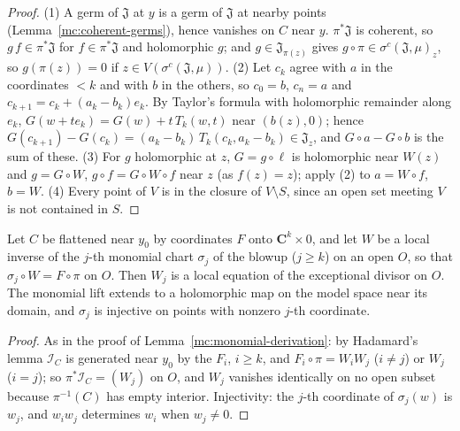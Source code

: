 \begin{proof}
\leanok
(1) A germ of \(\mathfrak J\) at \(y\) is a germ of \(\mathfrak J\) at nearby points (Lemma~\ref{mc:coherent-germs}), hence vanishes on \(C\) near \(y\).
\(\pi^*\mathfrak J\) is coherent, so \(g\,f\in\pi^*\mathfrak J\) for \(f\in\pi^*\mathfrak J\) and holomorphic \(g\); and \(g\in\mathfrak J_{\pi(z)}\) gives
\(g\circ\pi\in\sigma^c(\mathfrak J,\mu)_z\), so \(g(\pi(z))=0\) if \(z\in V(\sigma^c(\mathfrak J,\mu))\).
(2) Let \(c_k\) agree with \(a\) in the coordinates \(<k\) and with \(b\) in the others, so \(c_0=b\), \(c_n=a\) and
\(c_{k+1}=c_k+(a_k-b_k)e_k\). By Taylor's formula with holomorphic remainder along \(e_k\), \(G(w+te_k)=G(w)+t\,T_k(w,t)\) near \((b(z),0)\);
hence \(G(c_{k+1})-G(c_k)=(a_k-b_k)\,T_k(c_k,a_k-b_k)\in\mathfrak J_z\), and \(G\circ a-G\circ b\) is the sum of these.
(3) For \(g\) holomorphic at \(z\), \(G=g\circ\ell\) is holomorphic near \(W(z)\) and \(g=G\circ W\), \(g\circ f=G\circ W\circ f\) near \(z\) (as \(f(z)=z\));
apply (2) to \(a=W\circ f\), \(b=W\).
(4) Every point of \(V\) is in the closure of \(V\setminus S\), since an open set meeting \(V\) is not contained in \(S\).
\end{proof}

\begin{lemma}
\label{mc:monomial-local-equation}
\leanok
Let \(C\) be flattened near \(y_0\) by coordinates \(F\) onto \(\mathbf C^k\times0\), and let \(W\) be a local inverse of the \(j\)-th monomial chart
\(\sigma_j\) of the blowup (\(j\ge k\)) on an open \(O\), so that \(\sigma_j\circ W=F\circ\pi\) on \(O\). Then \(W_j\) is a local equation of the
exceptional divisor on \(O\). The monomial lift extends to a holomorphic map on the model space near its domain, and \(\sigma_j\) is injective
on points with nonzero \(j\)-th coordinate.
\end{lemma}
\begin{proof}
\leanok
As in the proof of Lemma~\ref{mc:monomial-derivation}: by Hadamard's lemma \(\mathcal I_C\) is generated near \(y_0\) by the \(F_i\), \(i\ge k\), and
\(F_i\circ\pi=W_iW_j\) (\(i\neq j\)) or \(W_j\) (\(i=j\)); so \(\pi^*\mathcal I_C=(W_j)\) on \(O\), and \(W_j\) vanishes identically on no open subset because
\(\pi^{-1}(C)\) has empty interior. Injectivity: the \(j\)-th coordinate of \(\sigma_j(w)\) is \(w_j\), and \(w_iw_j\) determines \(w_i\) when
\(w_j\neq0\).
\end{proof}

